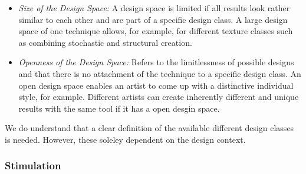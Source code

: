 \begin{itemize}
    \item \textit{Size of the Design Space:} A design space is limited if all results look rather similar to each other and are part of a specific design class. A large design space of one technique allows, for example, for different texture classes such as combining stochastic and structural creation.


    \item \textit{Openness of the Design Space:} Refers to the limitlessness of possible designs and that there is no attachment of the technique to a specific design class. An open design space enables an artist to come up with a distinctive individual style, for example. Different artists can create inherently different and unique results with the same tool if it has a open desgin space.

    
\end{itemize}

We do understand that a clear definition of the available different design classes is needed. However, these soleley dependent on the design context. 


\subsubsection{Stimulation}
\label{subsubsec:stimulation}

